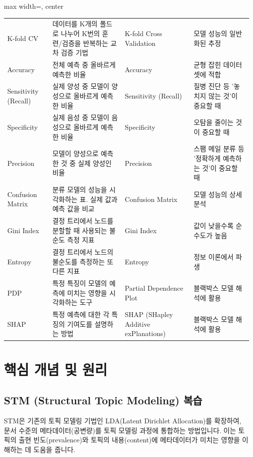 \documentclass[11pt,a4paper]{article}
\theoremstyle{definition}
\begin{document}
\begin{adjustbox}{max width=\textwidth, center}
\begin{tabular}{llll}
K-fold CV & 데이터를 K개의 폴드로 나누어 K번의 훈련/검증을 반복하는 교차 검증 기법 & K-fold Cross Validation & 모델 성능의 일반화된 추정 \\
Accuracy & 전체 예측 중 올바르게 예측한 비율 & Accuracy & 균형 잡힌 데이터셋에 적합 \\
Sensitivity (Recall) & 실제 양성 중 모델이 양성으로 올바르게 예측한 비율 & Sensitivity (Recall) & 질병 진단 등 '놓치지 않는 것'이 중요할 때 \\
Specificity & 실제 음성 중 모델이 음성으로 올바르게 예측한 비율 & Specificity & 오탐을 줄이는 것이 중요할 때 \\
Precision & 모델이 양성으로 예측한 것 중 실제 양성인 비율 & Precision & 스팸 메일 분류 등 '정확하게 예측하는 것'이 중요할 때 \\
Confusion Matrix & 분류 모델의 성능을 시각화하는 표. 실제 값과 예측 값을 비교 & Confusion Matrix & 모델 성능의 상세 분석 \\
Gini Index & 결정 트리에서 노드를 분할할 때 사용되는 불순도 측정 지표 & Gini Index & 값이 낮을수록 순수도가 높음 \\
Entropy & 결정 트리에서 노드의 불순도를 측정하는 또 다른 지표 & Entropy & 정보 이론에서 파생 \\
PDP & 특정 특징이 모델의 예측에 미치는 영향을 시각화하는 도구 & Partial Dependence Plot & 블랙박스 모델 해석에 활용 \\
SHAP & 특정 예측에 대한 각 특징의 기여도를 설명하는 방법 & SHAP (SHapley Additive exPlanations) & 블랙박스 모델 해석에 활용 \\
\bottomrule
\end{tabular}
\end{adjustbox}

\newpage
\section*{핵심 개념 및 원리}

\subsection{STM (Structural Topic Modeling) 복습}

STM은 기존의 토픽 모델링 기법인 LDA(Latent Dirichlet Allocation)를 확장하여, 문서 수준의 메타데이터(공변량)를 토픽 모델링 과정에 통합하는 방법입니다. 이는 토픽의 출현 빈도(prevalence)와 토픽의 내용(content)에 메타데이터가 미치는 영향을 이해하는 데 도움을 줍니다.
\end{document}
